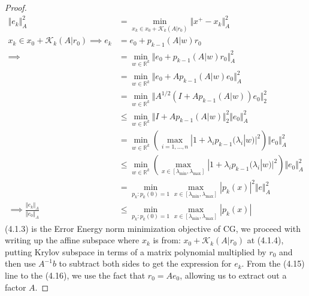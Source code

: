 \documentclass[]{article}
\theoremstyle{definition}
\begin{document}
        \begin{proof}
            \begin{align}
                \Vert e_k\Vert_A^2 & =
                \min_{x_k \in x_0 + \mathcal K_k(A|r_0)}
                \Vert 
                    x^+ - x_k
                \Vert_A^2
                \\
                x_k \in x_0 + \mathcal K_k(A|r_0) 
                \implies
                e_k &= e_0 + p_{k - 1}(A|w)r_0
                \\
                \implies  &=
                \min_{w\in \mathbb R^k}
                \Vert 
                    e_0 + p_{k - 1}(A|w)r_0
                \Vert_A^2
                \\
                &= \min_{w\in \mathbb R^k}
                \Vert 
                    e_0 + Ap_{k - 1}(A|w)e_0
                \Vert_A^2
                \\
                &= \min_{w\in \mathbb R^k}
                \Vert 
                    A^{1/2}(I + Ap_{k - 1}(A|w))e_0
                \Vert_2^2
                \\
                &\le
                \min_{w\in \mathbb R^k}
                \Vert 
                    I + Ap_{k - 1}(A|w)
                \Vert_2^2\Vert e_0\Vert_A^2 \quad 
                \\
                & = 
                \min_{w\in \mathbb R^k}
                \left(
                    \max_{i = 1, \dots, n}
                    |1 + \lambda_i p_{k - 1}(\lambda_i|w)|^2
                \right)\Vert e_0\Vert_A^2
                \quad
                \\
                & \le 
                \min_{w\in \mathbb R^k}
                \left(
                    \max_{x\in [\lambda_{\min}, \lambda_{\max}]}
                    |1 + \lambda_i p_{k - 1}(\lambda_i|w)|^2
                \right)\Vert e_0\Vert_A^2
                \quad 
                \\
                &= 
                \min_{p_{k}: p_{k}(0) = 1}
                \max_{x\in [\lambda_{\min}, \lambda_{\max}]}
                | p_{k}(x)|^2 \Vert e\Vert_A^2
                \\
                \implies
                \frac{\Vert e_k\Vert_A}{\Vert e_0\Vert_A} &\le 
                \min_{p_{k}: p_{k}(0) = 1}\max_{x\in [\lambda_{\text{min}}, \lambda_{\text{max}}]} |p_{k}(x)|
            \end{align}
            (4.1.3) is the Error Energy norm minimization objective of CG, we proceed with writing up the affine subspace where $x_k$ is from: $x_0 + \mathcal K_k(A|r_0)$ at (4.1.4), putting Krylov subspace in terms of a matrix polynomial multiplied by $r_0$ and then use $A^{-1}b$ to subtract both sides to get the expression for $e_k$. From the (4.15) line to the (4.16), we use the fact that $r_0 = Ae_0$, allowing us to extract out a factor $A$. 

\end{proof}
\end{document}
